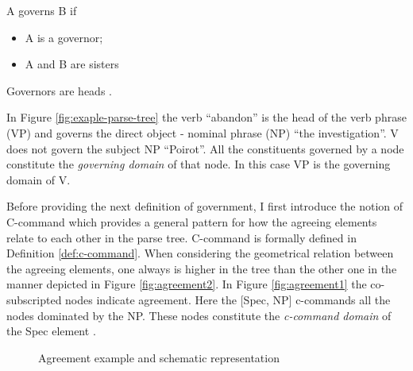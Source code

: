     \begin{definition}[government i]\label{def:government-i}
         A governs B if 
         \begin{itemize}
             \item A is a governor;
             \item A and B are sisters
         \end{itemize}
         Governors are heads \citep[86]{Haegeman1991}.
    \end{definition}

    In Figure \ref{fig:exaple-parse-tree} the verb ``abandon'' is the head of the verb phrase (VP) and governs the direct object - nominal phrase (NP) ``the investigation''. V does not govern the subject NP ``Poirot''. All the constituents governed by a node constitute the \textit{governing domain} of that node. In this case VP is the governing domain of V.

    Before providing the next definition of government, I first introduce the notion of C-command which provides a general pattern for how the agreeing elements relate to each other in the parse tree. C-command is formally defined in Definition \ref{def:c-command}. When considering the geometrical relation between the agreeing elements, one always is higher in the tree than the other one in the manner depicted in Figure \ref{fig:agreement2}. In Figure \ref{fig:agreement1} the co-subscripted nodes indicate agreement. Here the [Spec, NP] c-commands all the nodes dominated by the NP. These nodes constitute the \textit{c-command domain} of the Spec element \citep[134]{Haegeman1991}. 


    \begin{figure}[!ht]
        \centering
        \caption{Agreement example and schematic representation }
        \label{fig:agreement}
    \end{figure}
    
